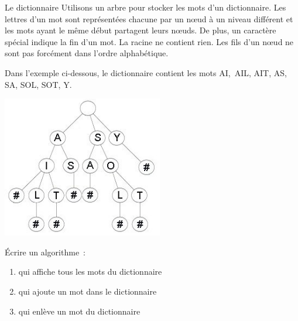 			\begin{Exercice}{Le dictionnaire}
				Utilisons un arbre pour stocker les mots d'un dictionnaire. 
				Les lettres d'un mot sont représentées chacune par
				un n{\oe}ud à un niveau différent et les mots ayant 
				le même début partagent leurs n{\oe}uds. De plus, un caractère
				spécial indique la fin d'un mot. La racine ne contient 
				rien. Les fils d'un n{\oe}ud ne sont pas forcément dans 
				l'ordre	alphabétique.
				
				Dans l'exemple ci-dessous, le dictionnaire contient les mots 
				AI,~AIL, AIT, AS, SA, SOL, SOT, Y.
				\begin{center}
				\includegraphics[width=6.999cm,height=6.195cm]{image/a2012Logique2eme-img039.jpg}
				\end{center}
				
				Écrire un algorithme~:
				
				\begin{enumerate}
					\item {
						qui affiche tous les mots du dictionnaire}
					\item {
						qui ajoute un mot dans le dictionnaire}
					\item {
						qui enlève un mot du dictionnaire}
				\end{enumerate}
			\end{Exercice}
			
